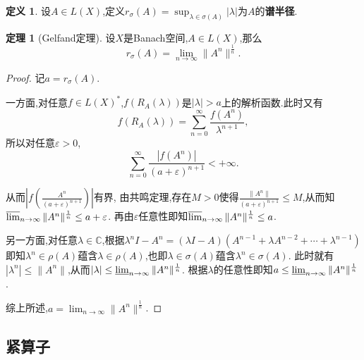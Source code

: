 \documentclass{ctexart}
\theoremstyle{definition}
\newtheorem{definition}{定义}
\newtheorem{theorem}{定理}
\theoremstyle{remark}
\begin{document}
	\begin{definition}
		设$A\in L(X)$,定义$r_\sigma(A)=\sup_{\lambda\in\sigma(A)}{|\lambda|}$为$A$的\textbf{谱半径}.
	\end{definition}
	\begin{theorem}[Gelfand定理]
		设$X$是Banach空间,$A\in L(X)$,那么
		$$r_\sigma(A)=\lim_{n\to\infty}{\|A^n\|^\frac{1}{n}}.$$
	\end{theorem}
	\begin{proof}
		记$a=r_\sigma(A)$.
		
		一方面,对任意$f\in L(X)^*$,$f(R_A(\lambda))$是$|\lambda|>a$上的解析函数.此时又有
		$$f(R_A(\lambda))=\sum_{n=0}^\infty\frac{f(A^n)}{\lambda^{n+1}},$$
		所以对任意$\varepsilon>0$,
		$$\sum_{n=0}^\infty\frac{|f(A^n)|}{(a+\varepsilon)^{n+1}}<+\infty.$$
		
		从而$\left|f(\frac{A^n}{(a+\varepsilon)^{n+1}})\right|$有界,
		由共鸣定理,存在$M>0$使得$\frac{\|A^n\|}{(a+\varepsilon)^{n+1}}\le M$,从而知$\varlimsup_{n\to\infty}{\|A^n\|^\frac{1}{n}}\le a+\varepsilon$.
		再由$\varepsilon$任意性即知$\varlimsup_{n\to\infty}{\|A^n\|^\frac{1}{n}}\le a$.
		
		另一方面,对任意$\lambda\in\mathbb{C}$,根据$\lambda^nI-A^n=(\lambda I-A)(A^{n-1}+\lambda A^{n-2}+\cdots+\lambda^{n-1})$即知$\lambda^n\in\rho(A)$蕴含$\lambda\in\rho(A)$,也即$\lambda\in\sigma(A)$蕴含$\lambda^n\in\sigma(A)$.
		此时就有$|\lambda^n|\le\|A^n\|$,从而$|\lambda|\le\varliminf_{n\to\infty}{\|A^n\|^\frac{1}{n}}$.
		根据$\lambda$的任意性即知$a\le\varliminf_{n\to\infty}{\|A^n\|^\frac{1}{n}}$.
		
		综上所述,$a=\lim_{n\to\infty}{\|A^n\|^\frac{1}{n}}$.
	\end{proof}
	
	\subsection{紧算子}
	
\end{document}
